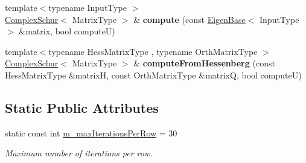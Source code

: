 \begin{DoxyCompactItemize}
{\footnotesize template$<$typename Input\+Type $>$ }\\\mbox{\hyperlink{class_eigen_1_1_complex_schur}{Complex\+Schur}}$<$ Matrix\+Type $>$ \& {\bfseries compute} (const \mbox{\hyperlink{struct_eigen_1_1_eigen_base}{Eigen\+Base}}$<$ Input\+Type $>$ \&matrix, bool computeU)
\item 
\mbox{\label{class_eigen_1_1_complex_schur_aa994974c184fa6df704b14f85c98f3e3}} 
{\footnotesize template$<$typename Hess\+Matrix\+Type , typename Orth\+Matrix\+Type $>$ }\\\mbox{\hyperlink{class_eigen_1_1_complex_schur}{Complex\+Schur}}$<$ Matrix\+Type $>$ \& {\bfseries compute\+From\+Hessenberg} (const Hess\+Matrix\+Type \&matrixH, const Orth\+Matrix\+Type \&matrixQ, bool computeU)
\end{DoxyCompactItemize}
\subsection*{Static Public Attributes}
\begin{DoxyCompactItemize}
\item 
static const int \mbox{\hyperlink{class_eigen_1_1_complex_schur_ad37ef6058ce690a1fac4cc524b70cbf0}{m\+\_\+max\+Iterations\+Per\+Row}} = 30
\begin{DoxyCompactList}\small\item\em Maximum number of iterations per row. \end{DoxyCompactList}\end{DoxyCompactItemize}
